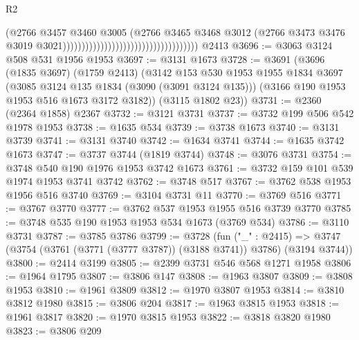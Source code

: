 \begin{lexlean}{R2}
\begin{coremodule}
                                                                      (@2766
                                                                        @3457
                                                                        @3460
                                                                        @3005
                                                                        (@2766
                                                                          @3465
                                                                          @3468
                                                                          @3012
                                                                          (@2766
                                                                            @3473
                                                                            @3476
                                                                            @3019
                                                                            @3021))))))))))))))))))))))))))))))))))))
    @2413
@3696 := @3063 @3124 @508 @531 @1956 @1953
@3697 := @3131 @1673
@3728 := @3691
    (@3696
      (@1835 @3697)
      (@1759 @2413)
      (@3142
        @153
        @530
        @1953
        @1955
        @1834
        @3697
        (@3085 @3124 @135 @1834 (@3090 (@3091 @3124 @135)))
        (@3166 @190 @1953 @1953 @516 @1673 @3172 @3182))
      (@3115 @1802 @23))
@3731 := @2360 (@2364 @1858) @2367
@3732 := @3121 @3731
@3737 := @3732 @199 @506 @542 @1978 @1953
@3738 := @1635 @534
@3739 := @3738 @1673
@3740 := @3131 @3739
@3741 := @3131 @3740
@3742 := @1634 @3741
@3744 := @1635 @3742 @1673
@3747 := @3737 @3744 (@1819 @3744)
@3748 := @3076 @3731
@3754 := @3748 @540 @190 @1976 @1953 @3742 @1673
@3761 := @3732 @159 @101 @539 @1974 @1953 @3741 @3742
@3762 := @3748 @517
@3767 := @3762 @538 @1953 @1956 @516 @3740
@3769 := @3104 @3731 @11
@3770 := @3769 @516
@3771 := @3767 @3770
@3777 := @3762 @537 @1953 @1955 @516 @3739 @3770
@3785 := @3748 @535 @190 @1953 @1953 @534 @1673 (@3769 @534)
@3786 := @3110 @3731
@3787 := @3785 @3786
@3799 := @3728
    (fun ("_" : @2415) =>
    @3747 (@3754 (@3761 (@3771 (@3777 @3787)) (@3188 @3741)) @3786) (@3194 @3744))
@3800 := @2414 @3199
@3805 := @2399 @3731 @546 @568 @1271 @1958
@3806 := @1964 @1795
@3807 := @3806 @147
@3808 := @1963 @3807
@3809 := @3808 @1953
@3810 := @1961 @3809
@3812 := @1970 @3807 @1953
@3814 := @3810 @3812 @1980
@3815 := @3806 @204
@3817 := @1963 @3815 @1953
@3818 := @1961 @3817
@3820 := @1970 @3815 @1953
@3822 := @3818 @3820 @1980
@3823 := @3806 @209

\end{coremodule}
\end{lexlean}
